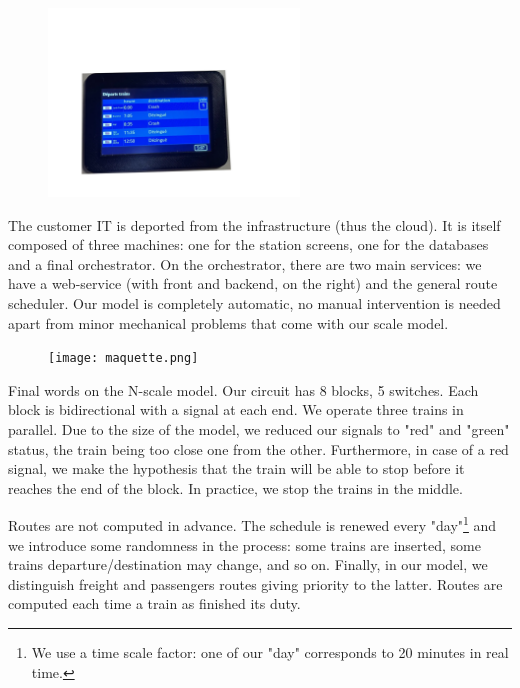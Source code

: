 \documentclass[runningheads]{llncs}
\begin{document}
\begin{figure}
\hspace{-10mm}
 \begin{minipage}{0.3\textwidth}
        \centering
        \vspace{-24mm}
\includegraphics[height=50mm]{ZoomAffichage.png}
    \end{minipage}
\end{figure}

 The customer IT is deported from the infrastructure (thus the cloud).  It is itself composed of three machines: one for the station screens, one for the databases and a final orchestrator. On the orchestrator, there are two main services: we have a web-service (with front and backend, on the right) and the general route scheduler.  Our model is completely automatic, no manual intervention is needed apart from minor mechanical problems that come with our scale model.
 
\begin{figure}
 \begin{minipage}{0.28\textwidth}
        \centering
        \vspace{-1mm}
\texttt{[image: maquette.png]}
    \end{minipage}
\end{figure}

Final words on the N-scale model. Our circuit has 8 blocks, 5 switches. Each block is bidirectional with a signal at each end.  We operate  three trains in parallel. Due to the size of the model, we reduced our signals  to "red" and "green" status, the train being too close one from the other. Furthermore, in case of a red signal, we make the hypothesis that the train will be able to stop before it reaches the end of the block. In practice, we stop the trains in the middle. 


Routes are not computed in advance. The schedule is renewed every "day"\footnote{We use a time scale factor: one of our "day" corresponds to 20 minutes in real time.}  and we introduce some randomness in the process: some trains are inserted, some trains departure/destination may change, and so on. Finally, in our model, we distinguish freight and  passengers routes giving priority to the latter. Routes are computed each time a train as finished its duty. 
 
\end{document}
